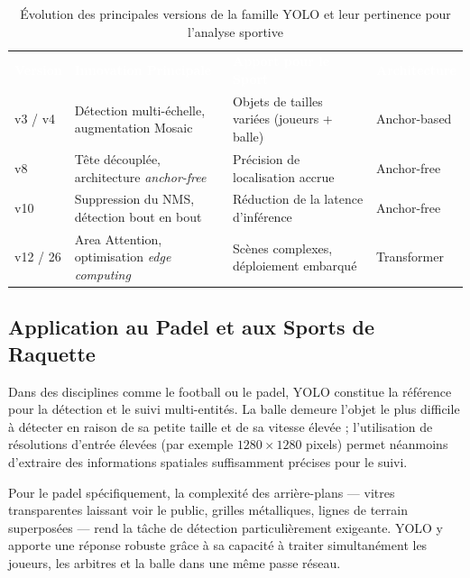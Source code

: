 \begin{itemize}
\begin{table}[H]
  \centering
  \renewcommand{\arraystretch}{1.3}
  \begin{tabularx}{\textwidth}{C{2cm} X X C{2.8cm}}
    \textcolor{white}{\textbf{Version}} &
    \textcolor{white}{\textbf{Innovation Principale}} &
    \textcolor{white}{\textbf{Apport pour le Sport}} &
    \textcolor{white}{\textbf{Architecture}} \\
    v3 / v4 &
    Détection multi-échelle, augmentation Mosaic &
    Objets de tailles variées (joueurs + balle) &
    Anchor-based \\
    v8 &
    Tête découplée, architecture \textit{anchor-free} &
    Précision de localisation accrue &
    Anchor-free \\
    v10 &
    Suppression du NMS, détection bout en bout &
    Réduction de la latence d'inférence &
    Anchor-free \\
    v12 / 26 &
    Area Attention, optimisation \textit{edge computing} &
    Scènes complexes, déploiement embarqué &
    Transformer \\
  \end{tabularx}
  \caption{Évolution des principales versions de la famille YOLO et leur pertinence
           pour l'analyse sportive}
  \label{tab:yolo_versions}
\end{table}

\subsection{Application au Padel et aux Sports de Raquette}

Dans des disciplines comme le football ou le padel, YOLO constitue la référence
pour la détection et le suivi multi-entités. La balle demeure l'objet le plus
difficile à détecter en raison de sa petite taille et de sa vitesse élevée ;
l'utilisation de résolutions d'entrée élevées (par exemple $1280 \times 1280$
pixels) permet néanmoins d'extraire des informations spatiales suffisamment
précises pour le suivi.

Pour le padel spécifiquement, la complexité des arrière-plans — vitres
transparentes laissant voir le public, grilles métalliques, lignes de terrain
superposées — rend la tâche de détection particulièrement exigeante. YOLO y
apporte une réponse robuste grâce à sa capacité à traiter simultanément les
joueurs, les arbitres et la balle dans une même passe réseau.


\end{itemize}
